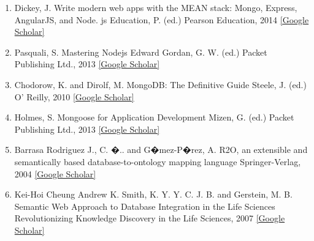 \documentclass[10pt,twocolumn,twoside]{article}
\begin{document}
\begin{enumerate}
\item Dickey, J.
Write modern web apps with the MEAN stack: Mongo, Express, AngularJS, and Node. js
Education, P. (ed.)
Pearson Education, 2014
 \href{}{[Google Scholar]}

\item Pasquali, S.
Mastering Nodejs
Edward Gordan, G. W. (ed.)
Packet Publishing Ltd., 2013
 \href{}{[Google Scholar]}

\item Chodorow, K. and Dirolf, M.
MongoDB: The Definitive Guide
Steele, J. (ed.)
O' Reilly, 2010
 \href{}{[Google Scholar]}

\item Holmes, S.
Mongoose for Application Development
Mizen, G. (ed.)
Packet Publishing Ltd., 2013
 \href{}{[Google Scholar]}

\item Barrasa Rodriguez J., C. �.. and G�mez-P�rez, A.
R2O, an extensible and semantically based database-to-ontology mapping language
Springer-Verlag, 2004
 \href{}{[Google Scholar]}

\item Kei-Hoi Cheung Andrew K. Smith, K. Y. Y. C. J. B. and Gerstein, M. B.
Semantic Web Approach to Database Integration in the Life Sciences
Revolutionizing Knowledge Discovery in the Life Sciences, 2007
 \href{}{[Google Scholar]}

\end{enumerate}


\nocite{*}


\end{document}

